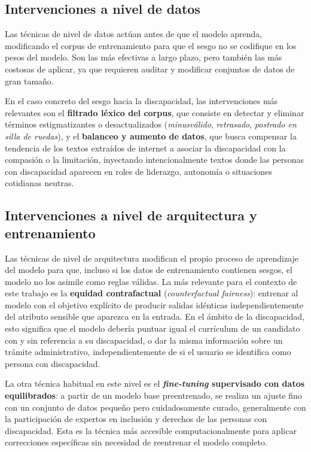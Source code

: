 \documentclass[12pt]{report} %
\renewcommand{\_}{\oldunderscore\allowbreak}
\begin{document}
\subsection{Intervenciones a nivel de datos}
Las técnicas de nivel de datos actúan antes de que el modelo aprenda, modificando el corpus de entrenamiento para que el sesgo no se codifique en los pesos del modelo. Son las más efectivas a largo plazo, pero también las más costosas de aplicar, ya que requieren auditar y modificar conjuntos de datos de gran tamaño.

En el caso concreto del sesgo hacia la discapacidad, las intervenciones más relevantes son el \textbf{filtrado léxico del corpus}, que consiste en detectar y eliminar términos estigmatizantes o desactualizados (\textit{minusválido}, \textit{retrasado}, \textit{postrado en silla de ruedas}), y el \textbf{balanceo y aumento de datos}, que busca compensar la tendencia de los textos extraídos de internet a asociar la discapacidad con la compasión o la limitación, inyectando intencionalmente textos donde las personas con discapacidad aparecen en roles de liderazgo, autonomía o situaciones cotidianas neutras.

\subsection{Intervenciones a nivel de arquitectura y entrenamiento}
Las técnicas de nivel de arquitectura modifican el propio proceso de aprendizaje del modelo para que, incluso si los datos de entrenamiento contienen sesgos, el modelo no los asimile como reglas válidas. La más relevante para el contexto de este trabajo es la \textbf{equidad contrafactual} (\textit{counterfactual fairness}): entrenar al modelo con el objetivo explícito de producir salidas idénticas independientemente del atributo sensible que aparezca en la entrada. En el ámbito de la discapacidad, esto significa que el modelo debería puntuar igual el currículum de un candidato con y sin referencia a su discapacidad, o dar la misma información sobre un trámite administrativo, independientemente de si el usuario se identifica como persona con discapacidad.

La otra técnica habitual en este nivel es el \textbf{\textit{fine-tuning} supervisado con datos equilibrados}: a partir de un modelo base preentrenado, se realiza un ajuste fino con un conjunto de datos pequeño pero cuidadosamente curado, generalmente con la participación de expertos en inclusión y derechos de las personas con discapacidad. Esta es la técnica más accesible computacionalmente para aplicar correcciones específicas sin necesidad de reentrenar el modelo completo.
\end{document}
